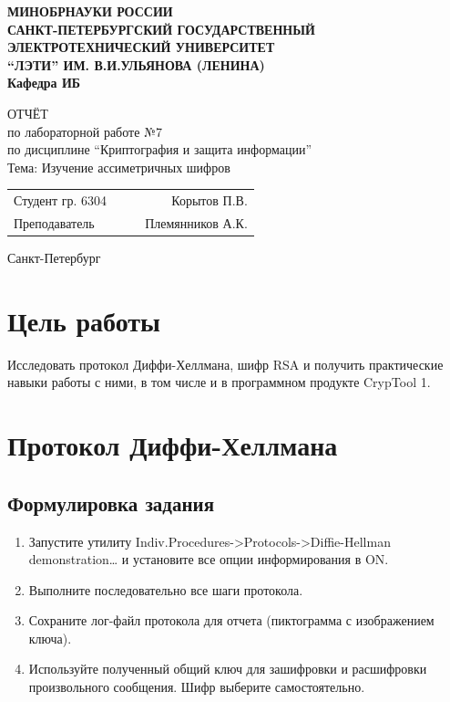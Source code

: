 \documentclass[a4paper, 14pt]{extarticle}
\begin{document}
\begin{titlepage}
    \centering
    {\bfseries
        \uppercase{
            Минобрнауки России \\
            Санкт-Петербургский государственный \\
            Электротехнический университет \\
            \enquote{ЛЭТИ} им. В.И.Ульянова (Ленина)\\
        }
        Кафедра ИБ

        \vspace{\fill}
        \uppercase{Отчёт} \\
        по лабораторной работе №7 \\
        по дисциплине \enquote{Криптография и защита информации} \\
        Тема: Изучение ассиметричных шифров
    }

    \vspace{\fill}
    \begin{tabularx}{0.8\textwidth}{l X c r}
        Студент гр. 6304 & & \underline{\hspace{3cm}} & Корытов П.В.\\
        Преподаватель & & \underline{\hspace{3cm}} & Племянников А.К.
    \end{tabularx}

    \vspace{1cm}
    Санкт-Петербург \\
    \the\year{}
\end{titlepage}
\section*{Цель работы}
Исследовать протокол Диффи-Хеллмана, шифр RSA и получить практические навыки работы с ними, в том числе и в программном продукте CrypTool 1.

\section{Протокол Диффи-Хеллмана}
\subsection{Формулировка задания}
\begin{enumerate}
    \item Запустите утилиту Indiv.Procedures->Protocols->Diffie-Hellman demonstration… и установите все опции информирования в ON.\@
    \item  Выполните последовательно все шаги протокола.
    \item  Сохраните лог-файл протокола для отчета (пиктограмма с изображением ключа).
    \item  Используйте полученный общий ключ для зашифровки и расшифровки произвольного сообщения. Шифр выберите самостоятельно.
\end{enumerate}
\end{document}
